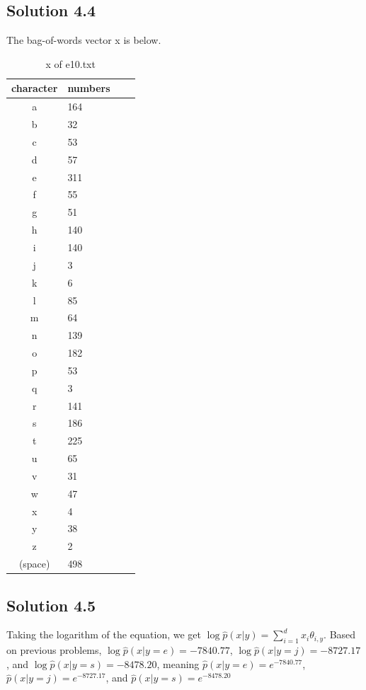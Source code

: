 \documentclass[a4paper]{article}
\theoremstyle{definition}
\newenvironment{soln}{
	\leavevmode\color{blue}\ignorespaces
}{}
\begin{document}
	\subsection*{Solution 4.4}	
	\begin{soln}
	The bag-of-words vector x is below.
	\begin{table}[ht]
 \caption{x of e10.txt}
 \centering
  \begin{tabular}{clll}
   \hline
   character & numbers \\
   \hline \hline
a & 164 \\
b & 32 \\
c & 53 \\
d & 57 \\
e & 311 \\
f & 55 \\
g & 51 \\
h & 140 \\
i & 140 \\
j & 3 \\
k & 6 \\
l & 85 \\
m & 64 \\
n & 139 \\
o & 182 \\
p & 53 \\
q & 3 \\
r & 141 \\
s & 186 \\
t & 225 \\
u & 65 \\
v & 31 \\
w & 47 \\
x & 4 \\
y & 38 \\
z & 2 \\
(space)  & 498 \\
   \hline
  \end{tabular}
\end{table}
	\end{soln}

	\clearpage
	\subsection*{Solution 4.5}	
	\begin{soln}
	Taking the logarithm of the equation, we get $\log \hat{p}(x|y) = \sum_{i=1}^{d} x_i \theta_{i,y} $. Based on previous problems, $\log \hat{p}(x|y=e) = -7840.77$, $\log \hat{p}(x|y=j) = -8727.17$, and $\log \hat{p}(x|y=s) = -8478.20$, meaning $\hat{p}(x|y=e) = e^{-7840.77}$, $\hat{p}(x|y=j) = e^{-8727.17}$, and $\hat{p}(x|y=s) = e^{-8478.20}$
	\end{soln}
	
\end{document}
